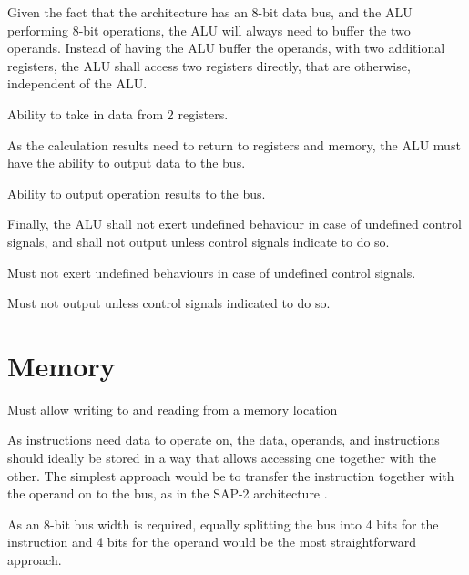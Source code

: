 Given the fact that the architecture has an 8-bit data bus, and the ALU performing 8-bit operations, the ALU will always need to buffer the two operands. Instead of having the ALU buffer the operands, with two additional registers, the ALU shall access two registers directly, that are otherwise, independent of the ALU.
\begin{arch-requirement}
  Ability to take in data from 2 registers.
\end{arch-requirement}

As the calculation results need to return to registers and memory, the ALU must have the ability to output data to the bus.
\begin{arch-requirement}
  Ability to output operation results to the bus. 
\end{arch-requirement}

Finally, the ALU shall not exert undefined behaviour in case of undefined control signals, and shall not output unless control signals indicate to do so. 

\begin{feat-requirement} \label{req:alu-undef-behavior}
  Must not exert undefined behaviours in case of undefined control signals. 
\end{feat-requirement}

\begin{feat-requirement} \label{req:alu-no-output}
  Must not output unless control signals indicated to do so. 
\end{feat-requirement}

\section{Memory}

\begin{turing-requirement}
Must allow writing to and reading from a memory location
\end{turing-requirement}

As instructions need data to operate on, the data, operands, and instructions should ideally be stored in a way that allows accessing one together with the other. The simplest approach would be to transfer the instruction together with the operand on to the bus, as in the SAP-2 architecture \cite{malvino1983a}.

As an 8-bit bus width is required, equally splitting the bus into 4 bits for the instruction and 4 bits for the operand would be the most straightforward approach.


